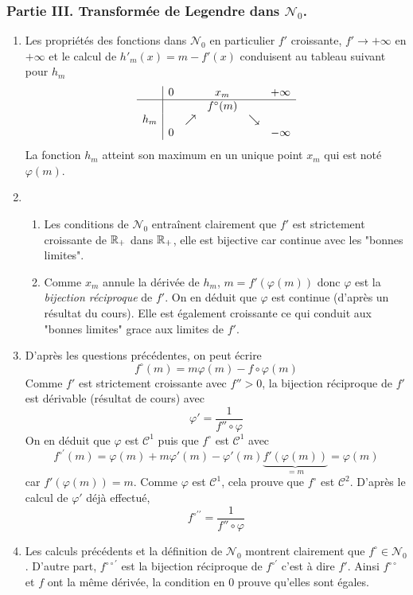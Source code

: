 \subsubsection*{Partie III. Transformée de Legendre dans $\mathcal{N}_0$.}
\begin{enumerate}
\item Les propriétés des fonctions dans $\mathcal{N}_0$  en particulier $f'$ croissante, $f'\rightarrow +\infty$ en $+\infty$ et le calcul de $h'_m(x)=m-f'(x)$ conduisent au tableau suivant pour $h_m$
\[
\begin{array}{c|ccccc}
& 0 &  & x_m &  & +\infty  \\
\hline
&  &  & f^{\circ}(m) &  &  \\
h_{m} &  & \nearrow  &  & \searrow  &  \\
& 0 &  &  &  & -\infty
\end{array}
\]
La fonction $h_m$ atteint son maximum en un unique point $x_m$ qui est noté $\varphi(m)$.
\item \begin{enumerate}
\item Les conditions de $\mathcal{N}_0$ entraînent clairement que $f'$ est strictement croissante de $\mathbb{R}_+$ dans $\mathbb{R}_+$, elle est bijective car continue avec les "bonnes limites".
\item Comme $x_m$ annule la dérivée de $h_m$, $m=f'(\varphi(m))$ donc $\varphi$ est la \emph{bijection réciproque} de $f'$. On en déduit que $\varphi$ est continue (d'après un résultat du cours). Elle est également croissante ce qui conduit aux "bonnes limites" grace aux limites de $f'$.
      \end{enumerate}
 \item D'après les questions précédentes, on peut écrire
 \[f^{\circ}(m)=m\varphi(m)-f\circ\varphi(m)\]
 Comme $f'$ est strictement croissante avec $f''>0$, la bijection réciproque de $f'$ est dérivable (résultat de cours) avec
 \[\varphi'=\frac{1}{f''\circ \varphi}\]
 On en déduit que $\varphi$ est $\mathcal{C}^1$ puis que $f^\circ$ est $\mathcal{C}^1$ avec
 \[f^{\circ\prime}(m)=\varphi(m)+m\varphi'(m)-\varphi'(m)\underbrace{f'(\varphi(m))}_{=m}=\varphi(m)\]
 car $f'(\varphi(m))=m$. Comme $\varphi$ est $\mathcal{C}^1$, cela prouve que $f^\circ$ est $\mathcal{C}^2$. D'après le calcul de $\varphi'$ déjà effectué,
 \[f^{\circ\prime \prime}=\frac{1}{f''\circ \varphi}\]
 \item Les calculs précédents et la définition de $\mathcal{N}_0$ montrent clairement que $f^\circ \in \mathcal{N}_0$. D'autre part, $f^{\circ\circ\prime}$ est la bijection réciproque de $f^{\circ\prime}$ c'est à dire $f'$. Ainsi $f^{\circ\circ}$ et $f$ ont la même dérivée, la condition en 0 prouve qu'elles sont égales.


\end{enumerate}
